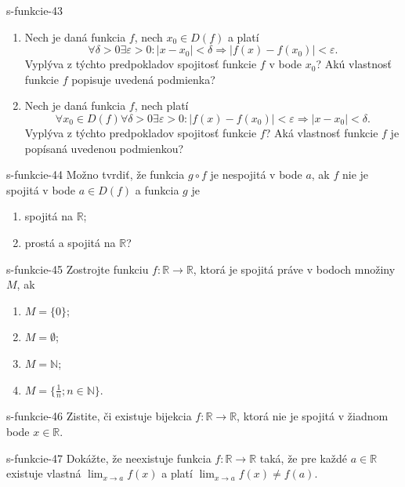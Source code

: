 	\begin{defproblem}{s-funkcie-43}
	\begin{enumerate}
	\item Nech je daná funkcia $f$, nech $x_0 \in D(f)$ a platí
	 $$\forall \delta>0 \exists \varepsilon >0: |x-x_0|<\delta \Rightarrow |f(x)-f(x_0)|<\varepsilon.$$
	 Vyplýva z týchto predpokladov spojitosť funkcie $f$ v bode $x_0$? Akú vlastnosť funkcie $f$ popisuje uvedená podmienka?
	\item Nech je daná funkcia $f$, nech platí
	$$\forall x_0 \in D(f) \forall \delta>0 \exists \varepsilon >0: |f(x)-f(x_0)|<\varepsilon \Rightarrow |x-x_0|<\delta.$$
	Vyplýva z týchto predpokladov spojitosť funkcie $f$? Aká vlastnosť funkcie $f$ je popísaná uvedenou podmienkou?
	\end{enumerate}
	\end{defproblem}
	
	\begin{defproblem}{s-funkcie-44}
	Možno tvrdiť, že funkcia $g \circ f$ je nespojitá v bode $a$, ak $f$ nie je spojitá v bode $a \in D(f)$ a funkcia $g$ je
	\begin{enumerate}
	\item spojitá na $\mathbb{R}$;
	\item prostá a spojitá na $\mathbb{R}$?
	\end{enumerate}
	\end{defproblem}
	
	\begin{defproblem}{s-funkcie-45}
	Zostrojte funkciu $f: \mathbb{R} \rightarrow \mathbb{R}$, ktorá je spojitá práve v bodoch množiny $M$, ak
	\begin{enumerate}
	\item $M=\{0\}$;
	\item $M=\emptyset$;
	\item $M=\mathbb{N}$;
	\item $M=\{\frac{1}{n};n \in \mathbb{N}\}$.
	\end{enumerate}
	\end{defproblem}
	
	\begin{defproblem}{s-funkcie-46}
	Zistite, či existuje bijekcia $f: \mathbb{R} \rightarrow \mathbb{R}$, ktorá nie je spojitá v žiadnom bode $x \in \mathbb{R}$.
	\end{defproblem}
	
	\begin{defproblem}{s-funkcie-47}
	Dokážte, že neexistuje funkcia $f: \mathbb{R} \rightarrow \mathbb{R}$ taká, že pre každé $a \in \mathbb{R}$ existuje vlastná $\lim_{x \rightarrow a}f(x)$ a platí $\lim_{x \rightarrow a}f(x) \neq f(a)$.
	\end{defproblem}
	
